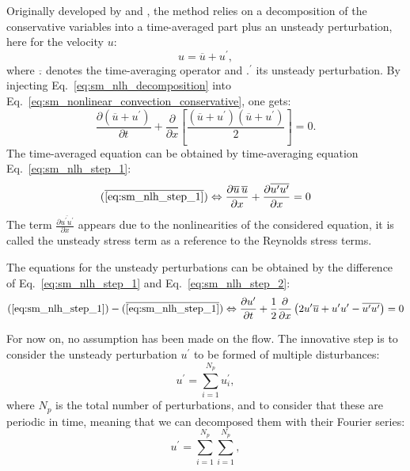 Originally developed by \citet{He1998} and \citet{Ning1998}, the method
relies on a decomposition of the conservative variables into a
time-averaged part plus an unsteady perturbation, here for the velocity
$u$:
\begin{equation}
	u = \overline{u} + u^\prime,
	\label{eq:sm_nlh_decomposition}
\end{equation}
where $\overline{.}$ denotes the time-averaging operator and
$.^\prime$ its unsteady perturbation.
By injecting Eq.~\ref{eq:sm_nlh_decomposition} into
Eq.~\ref{eq:sm_nonlinear_convection_conservative}, one gets:
\begin{equation}
	\frac{\partial \left( \overline{u} + u^\prime \right)}{\partial t} + 
	\frac{\partial}{\partial x} \left[\frac{
		\left( \overline{u} + u^\prime\right)
		\left( \overline{u} + u^\prime\right)}{2}\right] = 
	0.
	\label{eq:sm_nlh_step_1}
\end{equation}
The time-averaged equation can be obtained by time-averaging
equation Eq.~\ref{eq:sm_nlh_step_1}:
\begin{equation}
	(\overline{\ref{eq:sm_nlh_step_1}})
	\Leftrightarrow
	\frac{\partial \overline{u} \, \overline{u}}{\partial x} +
	\frac{\partial \overline{u^\prime u^\prime}}{\partial x} =
	0
	\label{eq:sm_nlh_step_2}
\end{equation}
The term $\frac{\partial \overline{u^\prime u^\prime}}{\partial x}$
appears due to the nonlinearities of the considered equation, it
is called the unsteady stress term as a reference to 
the Reynolds stress terms.

The equations for the unsteady perturbations can be obtained by
the difference of Eq.~\ref{eq:sm_nlh_step_1}
and Eq.~\ref{eq:sm_nlh_step_2}:
\begin{equation}
	(\ref{eq:sm_nlh_step_1}) - (\overline{\ref{eq:sm_nlh_step_1}})
	\Leftrightarrow
	\frac{\partial u^\prime}{\partial t} +
	\frac{1}{2} \frac{\partial}{\partial x} \left(
		2 u^\prime \overline{u} + 
		u^\prime u^\prime - 
		\overline{u^\prime u^\prime}\right) =
	0
	\label{eq:sm_nlh_step_3}
\end{equation}

For now on, no assumption has been made on the flow. The innovative step
is to consider the unsteady perturbation $u^\prime$ to be formed of
multiple disturbances:
\begin{equation}
	u^\prime = \sum_{i=1}^{N_p} u_i^\prime,
	\label{eq:sm_nlh_mp_disturbances_1}
\end{equation}
where $N_p$ is the total number of perturbations, and to consider that these
are periodic in time, 
meaning that we can decomposed them with their Fourier series:
\begin{equation}
	u^\prime = \sum_{i=1}^{N_p} \sum_{i=1}^{N_p},
	\label{eq:sm_nlh_mp_disturbances_2}
\end{equation}





